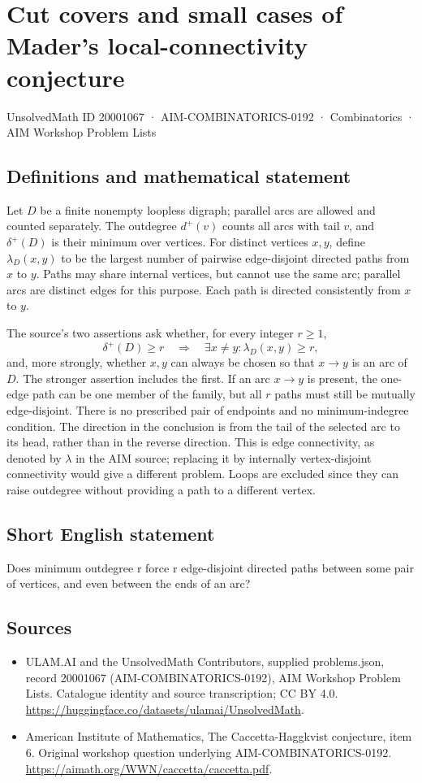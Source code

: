 \documentclass[11pt,a4paper]{article}
\begin{document}
\section*{Cut covers and small cases of Mader's local-connectivity conjecture}\label{20001067}
{\small UnsolvedMath ID 20001067 · AIM-COMBINATORICS-0192 · Combinatorics · AIM Workshop Problem Lists}
\subsection{Definitions and mathematical statement}
Let $D$ be a finite nonempty loopless digraph; parallel arcs are
allowed and counted separately. The outdegree $d^+(v)$ counts all
arcs with tail $v$, and $\delta^+(D)$ is their minimum over vertices.
For distinct vertices $x,y$, define $\lambda_D(x,y)$ to be the
largest number of pairwise edge-disjoint directed paths from $x$
to $y$. Paths may share internal vertices, but cannot use the same
arc; parallel arcs are distinct edges for this purpose. Each path
is directed consistently from $x$ to $y$.

The source's two assertions ask whether, for every integer $r\ge1$,
\[
 \delta^+(D)\ge r\quad\Longrightarrow\quad
 \exists x\ne y:\lambda_D(x,y)\ge r,
\]
and, more strongly, whether $x,y$ can always be chosen so that
$x\to y$ is an arc of $D$. The stronger assertion includes the first.
If an arc $x\to y$ is present, the one-edge path can be one member
of the family, but all $r$ paths must still be mutually edge-disjoint.
There is no prescribed pair of endpoints and no minimum-indegree
condition.
The direction in the conclusion is from the tail of the selected arc
to its head, rather than in the reverse direction. This is edge
connectivity, as denoted by $\lambda$ in the AIM source; replacing it
by internally vertex-disjoint connectivity would give a different
problem. Loops are excluded since they can raise outdegree without
providing a path to a different vertex.
\subsection{Short English statement}
Does minimum outdegree r force r edge-disjoint directed paths between some pair of vertices, and even between the ends of an arc?
\subsection{Sources}
\begin{itemize}
\item[S1] ULAM.AI and the UnsolvedMath Contributors, supplied problems.json, record 20001067 (AIM-COMBINATORICS-0192), AIM Workshop Problem Lists. Catalogue identity and source transcription; CC BY 4.0.
\url{https://huggingface.co/datasets/ulamai/UnsolvedMath}.
\item[S2] American Institute of Mathematics, The Caccetta-Haggkvist conjecture, item 6. Original workshop question underlying AIM-COMBINATORICS-0192.
\url{https://aimath.org/WWN/caccetta/caccetta.pdf}.
\end{itemize}
\end{document}
